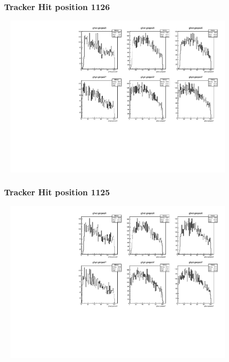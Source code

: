 \documentclass[slidestop,compress,mathserif]{beamer}
\begin{document}
\begin{frame}\frametitle{Tracker Hit position 1126}
	 \includegraphics[width=12cm,height=8cm]{Tracker_Hit_position_1126.pdf}
\end{frame}
\begin{frame}\frametitle{Tracker Hit position 1125}
	 \includegraphics[width=12cm,height=8cm]{Tracker_Hit_position_1125.pdf}
\end{frame}
\end{document}
